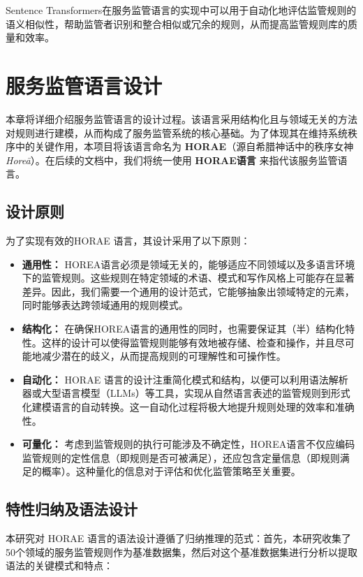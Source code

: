 Sentence Transformers在服务监管语言的实现中可以用于自动化地评估监管规则的语义相似性，帮助监管者识别和整合相似或冗余的规则，从而提高监管规则库的质量和效率。

\cleardoublepage

\section{服务监管语言设计}

本章将详细介绍服务监管语言的设计过程。该语言采用结构化且与领域无关的方法对规则进行建模，从而构成了服务监管系统的核心基础。为了体现其在维持系统秩序中的关键作用，本项目将该语言命名为 \textbf{HORAE}（源自希腊神话中的秩序女神 \textit{Horeā}）。在后续的文档中，我们将统一使用 \textbf{HORAE语言}  来指代该服务监管语言。

\subsection{设计原则}

为了实现有效的HORAE 语言，其设计采用了以下原则：

\begin{itemize}
    \item \textbf{通用性：} HOREA语言必须是领域无关的，能够适应不同领域以及多语言环境下的监管规则。这些规则在特定领域的术语、模式和写作风格上可能存在显著差异。因此，我们需要一个通用的设计范式，它能够抽象出领域特定的元素，同时能够表达跨领域通用的规则模式。
    \item \textbf{结构化：} 在确保HOREA语言的通用性的同时，也需要保证其（半）结构化特性。这样的设计可以使得监管规则能够有效地被存储、检查和操作，并且尽可能地减少潜在的歧义，从而提高规则的可理解性和可操作性。
    \item \textbf{自动化：} HORAE 语言的设计注重简化模式和结构，以便可以利用语法解析器或大型语言模型（LLMs）等工具，实现从自然语言表述的监管规则到形式化建模语言的自动转换。这一自动化过程将极大地提升规则处理的效率和准确性。
    \item \textbf{可量化：} 考虑到监管规则的执行可能涉及不确定性，HOREA语言不仅应编码监管规则的定性信息（即规则是否可被满足），还应包含定量信息（即规则满足的概率）。这种量化的信息对于评估和优化监管策略至关重要。
\end{itemize}

\subsection{特性归纳及语法设计}

本研究对 HORAE 语言的语法设计遵循了归纳推理的范式：首先，本研究收集了50个领域的服务监管规则作为基准数据集，然后对这个基准数据集进行分析以提取语法的关键模式和特点：

